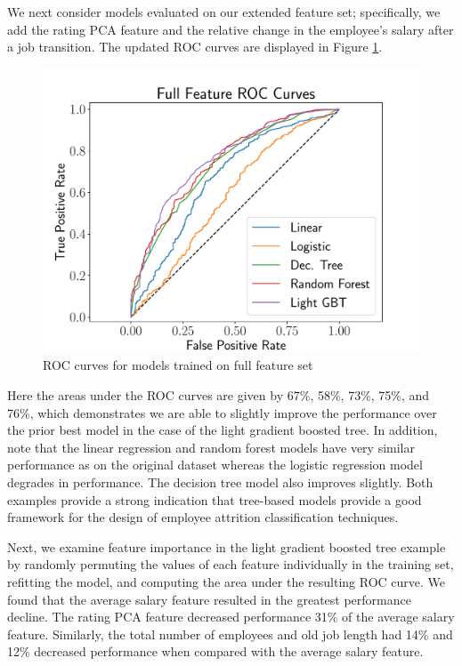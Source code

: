 \documentclass[10pt]{article}
\begin{document}
We next consider models evaluated on our extended feature set; specifically, we add the 
rating PCA feature and the relative change in the employee's salary after a job transition. 
The updated ROC curves are displayed in Figure \ref{fig:fullroc}.
%
\begin{figure}[thb]
    \centering
	\includegraphics[width=1.0\linewidth]{fullROC.pdf}
	\caption{ROC curves for models trained on full feature set}
	\label{fig:fullroc}
\end{figure}
%
Here the areas under the ROC curves are given by 67\%, 58\%, 73\%, 75\%, and 76\%, which demonstrates 
we are able to slightly improve the performance over the prior best model in the case of the 
light gradient boosted tree.  In addition, note that the linear regression and random forest models have
very similar 
performance as on the original dataset whereas the logistic regression model degrades in performance.  
The decision 
tree model also improves slightly.  Both examples provide a strong indication that tree-based models 
provide a good framework for the design of employee attrition classification techniques. 

Next, we examine feature importance in the light gradient boosted tree example by randomly permuting 
the values of each feature individually in the training set, refitting the model, and computing the 
area under the resulting ROC curve.  We found that the average salary feature resulted 
in the greatest performance decline.  The rating PCA feature decreased performance 31\% of the 
average salary feature.  Similarly, the total number of employees and old job length had 14\% and 
12\% decreased performance when compared with the average salary feature.
\end{document}
